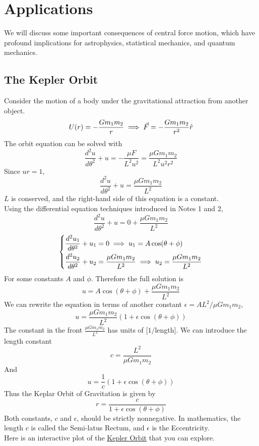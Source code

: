 \documentclass[11pt]{article}
\theoremstyle{gangnamstyle}{\newtheorem{definition}{Definition}[]}
\theoremstyle{gangnamstyle}{\newtheorem{example}{Example}[]}
\theoremstyle{gangnamstyle}{\newtheorem{problem}{Problem}[]}
\theoremstyle{gangnamstyle}{\newtheorem{warning}{Warning}[]}
\begin{document}
\pagebreak

\section{Applications}

We will discuss some important consequences of central force motion, which have profound implications for astrophysics, statistical mechanics, and quantum mechanics. 

\subsection{The Kepler Orbit}

Consider the motion of a body under the gravitational attraction from another object. 
\[ U(r) = -\frac{Gm_1m_2}{r} \implies \Vec{F} = -\frac{Gm_1m_2}{r^2}\Hat{r} \]
The orbit equation can be solved with
\[ \frac{d^2u}{d\theta^2} + u = - \frac{\mu F}{L^2u^2} = \frac{\mu Gm_1m_2}{L^2u^2r^2} \]
Since $ur = 1$,
\[ \frac{d^2u}{d\theta^2} + u = \frac{\mu Gm_1m_2}{L^2} \]
$L$ is conserved, and the right-hand side of this equation is a constant. \\
Using the differential equation techniques introduced in Notes 1 and 2, 
\[ \frac{d^2u}{d\theta^2} + u = 0 + \frac{\mu Gm_1m_2}{L^2} \]
\[ \begin{dcases}
\frac{d^2u_1}{d\theta^2} + u_1 = 0 \implies u_1 = A\cos(\theta + \phi) \\
\frac{d^2u_2}{d\theta^2} + u_2 = \frac{\mu Gm_1m_2}{L^2} \implies u_2 = \frac{\mu Gm_1m_2}{L^2}
\end{dcases}\]
For some constants $A$ and $\phi$. Therefore the full solution is
\[ u = A\cos(\theta + \phi) + \frac{\mu Gm_1m_2}{L^2} \]
We can rewrite the equation in terms of another constant $\epsilon = AL^2 / \mu Gm_1m_2$,
\[ u = \frac{\mu Gm_1m_2}{L^2}(1 + \epsilon\cos(\theta + \phi)) \]
The constant in the front $\frac{\mu Gm_1m_2}{L^2}$ has units of [$1/$length]. We can introduce the length constant
\[ c = \frac{L^2}{\mu Gm_1m_2} \]
And
\[ u = \frac{1}{c}(1 + \epsilon\cos(\theta + \phi)) \]
Thus the Keplar Orbit of Gravitation is given by
\[ r = \frac{c}{1 + \epsilon\cos(\theta + \phi)} \]
Both constants, $c$ and $\epsilon$, should be strictly nonnegative. In mathematics, the length $c$ is called the Semi-latus Rectum, and $\epsilon$ is the Eccentricity. \\
Here is an interactive plot of the \href{https://www.desmos.com/calculator/yxlirnqcd6}{Kepler Orbit} that you can explore. 
\end{document}
